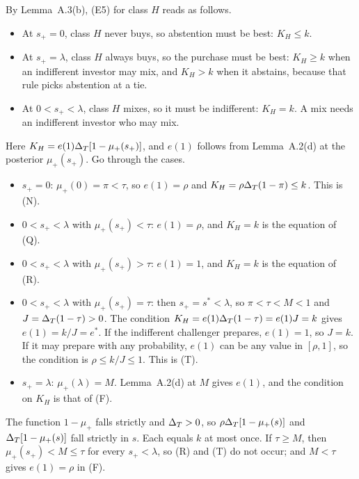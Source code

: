 \begin{derivation}
By Lemma~A.3(b), (E5) for class \(H\) reads as follows.
\begin{itemize}
\item At \(s_+=0\), class \(H\) never buys, so abstention must be best: \(K_H\le k\).
\item At \(s_+=\lambda\), class \(H\) always buys, so the purchase must be best: \(K_H\ge k\) when an indifferent
investor may mix, and \(K_H>k\) when it abstains, because that rule picks abstention at a tie.
\item At \(0<s_+<\lambda\), class \(H\) mixes, so it must be indifferent: \(K_H=k\). A mix needs an indifferent
investor who may mix.
\end{itemize}
Here \(K_H=e(1)\Delta_T[1-\mu_+(s_+)]\), and \(e(1)\) follows from Lemma~A.2(d) at the posterior \(\mu_+(s_+)\). Go through
the cases.
\begin{itemize}
\item \(s_+=0\): \(\mu_+(0)=\pi<\tau\), so \(e(1)=\rho\) and \(K_H=\rho\Delta_T(1-\pi)\le k\). This is (N).
\item \(0<s_+<\lambda\) with \(\mu_+(s_+)<\tau\): \(e(1)=\rho\), and \(K_H=k\) is the equation of (Q).
\item \(0<s_+<\lambda\) with \(\mu_+(s_+)>\tau\): \(e(1)=1\), and \(K_H=k\) is the equation of (R).
\item \(0<s_+<\lambda\) with \(\mu_+(s_+)=\tau\): then \(s_+=s^*<\lambda\), so \(\pi<\tau<M<1\) and \(J=\Delta_T(1-\tau)>0\).
The condition \(K_H=e(1)\Delta_T(1-\tau)=e(1)J=k\) gives \(e(1)=k/J=e^*\). If the indifferent challenger prepares,
\(e(1)=1\), so \(J=k\). If it may prepare with any probability, \(e(1)\) can be any value in \([\rho,1]\), so the
condition is \(\rho\le k/J\le1\). This is (T).
\item \(s_+=\lambda\): \(\mu_+(\lambda)=M\). Lemma~A.2(d) at \(M\) gives \(e(1)\), and the condition on \(K_H\) is that
of (F).
\end{itemize}
The function \(1-\mu_+\) falls strictly and \(\Delta_T>0\), so \(\rho\Delta_T[1-\mu_+(s)]\) and \(\Delta_T[1-\mu_+(s)]\) fall
strictly in \(s\). Each equals \(k\) at most once. If \(\tau\ge M\), then \(\mu_+(s_+)<M\le\tau\) for every
\(s_+<\lambda\), so (R) and (T) do not occur; and \(M<\tau\) gives \(e(1)=\rho\) in (F).
\end{derivation}

